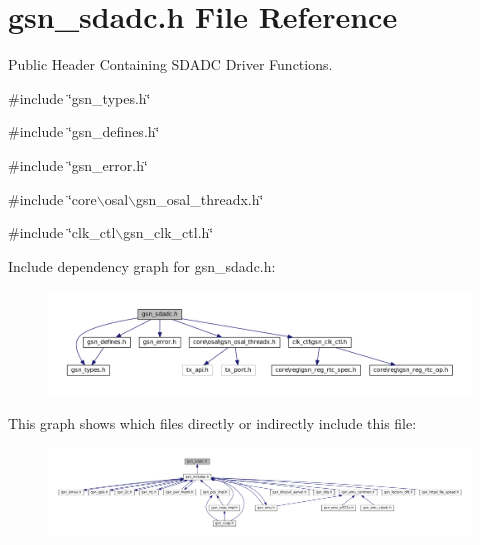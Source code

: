 \hypertarget{a00583}{
\section{gsn\_\-sdadc.h File Reference}
\label{a00583}
}


Public Header Containing SDADC Driver Functions.  


{\ttfamily \#include \char`\"{}gsn\_\-types.h\char`\"{}}\par
{\ttfamily \#include \char`\"{}gsn\_\-defines.h\char`\"{}}\par
{\ttfamily \#include \char`\"{}gsn\_\-error.h\char`\"{}}\par
{\ttfamily \#include \char`\"{}core$\backslash$osal$\backslash$gsn\_\-osal\_\-threadx.h\char`\"{}}\par
{\ttfamily \#include \char`\"{}clk\_\-ctl$\backslash$gsn\_\-clk\_\-ctl.h\char`\"{}}\par
Include dependency graph for gsn\_\-sdadc.h:
\nopagebreak
\begin{figure}[H]
\begin{center}
\leavevmode
\includegraphics[width=400pt]{a00819}
\end{center}
\end{figure}
This graph shows which files directly or indirectly include this file:
\nopagebreak
\begin{figure}[H]
\begin{center}
\leavevmode
\includegraphics[width=400pt]{a00820}
\end{center}
\end{figure}
